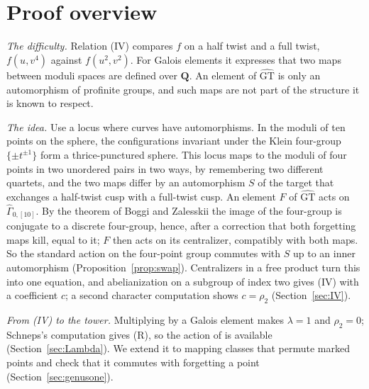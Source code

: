 \documentclass[11pt,a4paper]{article}
\theoremstyle{plain}
\theoremstyle{definition}
\theoremstyle{remark}
\newcommand{\GT}{\widehat{\mathrm{GT}}}
\newcommand{\Q}{\mathbf Q}
\newcommand{\Gh}{\widehat\Gamma}
\begin{document}
\section{Proof overview}

\emph{The difficulty.} Relation (IV) compares $f$ on a half twist and a full twist, $f(u,v^4)$ against
$f(u^2,v^2)$. For Galois elements it expresses that two maps between moduli spaces are defined over $\Q$. An
element of $\GT$ is only an automorphism of profinite groups, and such maps are not part of the structure it is
known to respect.

\emph{The idea.} Use a locus where curves have automorphisms. In the moduli of ten points on the sphere, the
configurations invariant under the Klein four-group $\{\pm t^{\pm1}\}$ form a thrice-punctured sphere. This locus
maps to the moduli of four points in two unordered pairs in two ways, by remembering two different quartets, and the
two maps differ by an automorphism $S$ of the target that exchanges a half-twist cusp with a full-twist cusp. An
element $F$ of $\GT$ acts on $\Gh_{0,[10]}$. By the theorem of Boggi and Zalesskii the image of the four-group is
conjugate to a discrete four-group, hence, after a correction that both forgetting maps kill, equal to it; $F$ then
acts on its centralizer, compatibly with both maps. So the standard action on the four-point group commutes with
$S$ up to an inner automorphism (Proposition~\ref{prop:swap}). Centralizers in a free product turn this into one
equation, and abelianization on a subgroup of index two gives (IV) with a coefficient $c$; a second character
computation shows $c=\rho_2$ (Section~\ref{sec:IV}).

\emph{From (IV) to the tower.} Multiplying by a Galois element makes $\lambda=1$ and $\rho_2=0$; Schneps's
computation gives (R), so the action of \cite{HLS} is available (Section~\ref{sec:Lambda}). We extend it to mapping
classes that permute marked points and check that it commutes with forgetting a point (Section~\ref{sec:genusone}).
\end{document}
